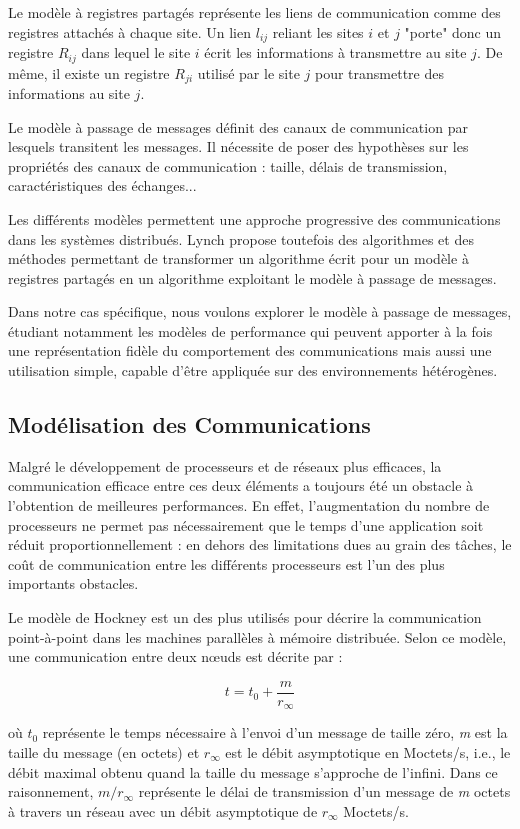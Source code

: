 Le modèle à registres partagés représente les liens de communication
comme des registres attachés à chaque site. Un lien $l_{ij}$ reliant
les sites $i$ et $j$ "porte" donc un registre $R_{ij}$ dans lequel
le site $i$ écrit les informations à transmettre au site $j$. De même,
il existe un registre $R_{ji}$ utilisé par le site $j$ pour
transmettre des informations au site $j$.

Le modèle à passage de messages définit des canaux de communication
par lesquels transitent les messages. Il nécessite de poser des
hypothèses sur les propriétés des canaux de communication : taille,
délais de transmission, caractéristiques des échanges...

Les différents modèles permettent une approche progressive des
communications dans les systèmes distribués. Lynch \cite{Lyn96}
propose toutefois des algorithmes et des méthodes permettant de
transformer un algorithme écrit pour un modèle à registres partagés en
un algorithme exploitant le modèle à passage de messages.

Dans notre cas spécifique, nous voulons explorer le modèle à passage de messages,
étudiant notamment les modèles de performance qui peuvent apporter à la fois une
représentation fidèle du comportement des communications mais aussi une 
utilisation simple, capable d'être appliquée sur des environnements hétérogènes.


\subsection{Modélisation des Communications}

Malgré le développement de processeurs et de réseaux plus efficaces,
la communication efficace entre ces deux éléments a toujours été un
obstacle à l'obtention de meilleures performances. En effet, l'augmentation
du nombre de processeurs ne permet pas nécessairement que le temps
d'une application soit réduit proportionnellement : en dehors des
limitations dues au grain des tâches, le coût de communication entre
les différents processeurs est l'un des plus importants obstacles.

Le modèle de Hockney \cite{Hockney94} est un des plus utilisés pour
décrire la communication point-à-point dans les machines parallèles
à mémoire distribuée. Selon ce modèle, une communication entre deux
n{\oe}uds est décrite par : 

\[
t=t_{0}+\frac{m}{r_{\infty}}\]


où $t_{0}$ représente le temps nécessaire à l'envoi d'un message
de taille zéro, \emph{m} est la taille du message (en octets) et $r_{\infty}$
est le débit asymptotique en Moctets/s, i.e., le débit maximal obtenu
quand la taille du message s'approche de l'infini. Dans ce raisonnement,
$m/r_{\infty}$ représente le délai de transmission d'un message de
\emph{m} octets à travers un réseau avec un débit asymptotique de
$r_{\infty}$ Moctets/s.

